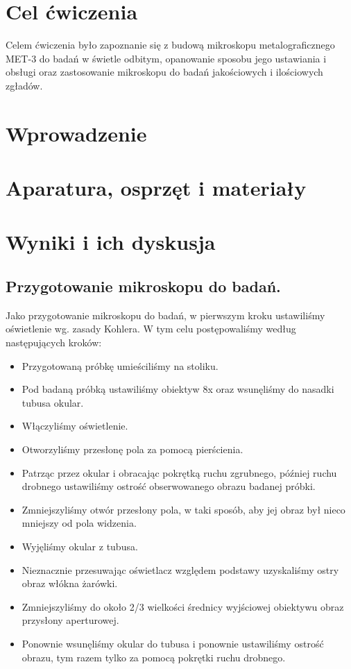 

\newcommand{\labdate}{28 listopada 2020}
\newcommand{\temat}{Mikroskop MET-3}


    



\section{Cel ćwiczenia}

Celem ćwiczenia było zapoznanie się z budową mikroskopu metalograficznego MET-3 do badań w świetle odbitym, opanowanie sposobu jego ustawiania i obsługi oraz zastosowanie mikroskopu do badań jakościowych i ilościowych zgładów.

\section{Wprowadzenie}



\section{Aparatura, osprzęt i materiały}



\section{Wyniki i ich dyskusja}

\subsection{Przygotowanie mikroskopu do badań.}

Jako przygotowanie mikroskopu do badań, w pierwszym kroku ustawiliśmy oświetlenie wg. zasady Kohlera.
W tym celu postępowaliśmy według następujących kroków:
\begin{itemize}
    \item Przygotowaną próbkę umieściliśmy na stoliku.
    \item Pod badaną próbką ustawiliśmy obiektyw 8x oraz wsunęliśmy do nasadki tubusa okular.
    \item Włączyliśmy oświetlenie.
    \item Otworzyliśmy przesłonę pola za pomocą pierścienia.
    \item Patrząc przez okular i obracając pokrętką ruchu zgrubnego, później ruchu drobnego ustawiliśmy ostrość obserwowanego obrazu badanej próbki.
    \item Zmniejszyliśmy otwór przesłony pola, w taki sposób, aby jej obraz był nieco mniejszy od pola widzenia.
    \item Wyjęliśmy okular z tubusa.
    \item Nieznacznie przesuwając oświetlacz względem podstawy uzyskaliśmy ostry obraz włókna żarówki.
    \item Zmniejszyliśmy do około 2/3 wielkości średnicy wyjściowej obiektywu obraz przysłony aperturowej.
    \item Ponownie wsunęliśmy okular do tubusa i ponownie ustawiliśmy ostrość obrazu, tym razem tylko za pomocą pokrętki ruchu drobnego.
\end{itemize}


